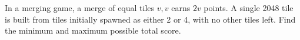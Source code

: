 In a merging game, a merge of equal tiles $v,v$ earns $2v$ points. A single 2048 tile is built from tiles initially spawned as either 2 or 4, with no other tiles left. Find the minimum and maximum possible total score.
